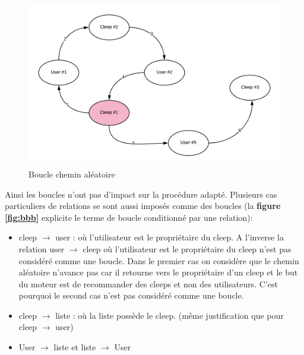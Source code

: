 \documentclass{article} %
\begin{document}
\begin{figure}[!h]
	\centering
	\includegraphics[keepaspectratio = true,scale=0.7]{boucle}
	\caption{Boucle chemin aléatoire}
	\label{fig:boucle}
\end{figure}
\newpage
Ainsi les boucles n'ont pas d'impact sur la procédure adapté. Plusieurs cas particuliers de relations se sont aussi imposés comme des boucles (la \textbf{figure \ref{fig:bbb}} explicite le terme de boucle conditionné par une relation):
\begin{itemize}
	\item cleep $\rightarrow$ user : où l'utilisateur est le propriétaire du cleep. A l'inverse la relation user $\rightarrow$ cleep où l'utilisateur est le propriétaire du cleep n'est pas considéré comme une boucle. Dans le premier cas on considère que le chemin aléatoire n'avance pas car il retourne vers le propriétaire d'un cleep et le but du moteur est de recommander des cleeps et non des utilisateurs. C'est pourquoi le second cas n'est pas considéré comme une boucle.
	\item cleep $\rightarrow$ liste : où la liste possède le cleep. (même justification que pour cleep $\rightarrow$ user)
	\item User  $\rightarrow$  liste et liste  $\rightarrow$  User
\end{itemize}
\end{document}
